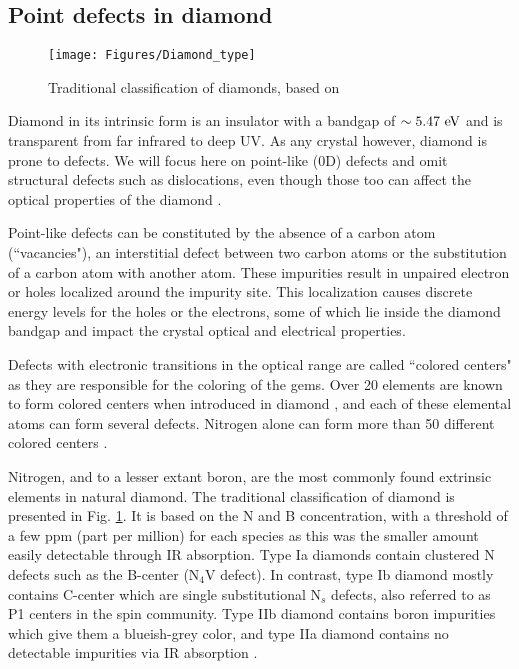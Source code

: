 \documentclass[a4paper,11pt]{report}
\begin{document}
\subsection{Point defects in diamond}
\begin{figure}[h!]
\centering
\texttt{[image: Figures/Diamond\_type]}
\caption{Traditional classification of diamonds, based on \citep{tappert2011diamonds}}
\label{diamond type}
\end{figure}
Diamond in its intrinsic form is an insulator with a bandgap of $\sim 5.47\ \rm eV$ and is transparent from far infrared to deep UV. As any crystal however, diamond is prone to defects. We will focus here on point-like (0D) defects and omit structural defects such as dislocations, even though those too can affect the optical properties of the diamond \citep{collins2000colour}. 

Point-like defects can be constituted by the absence of a carbon atom (``vacancies"), an interstitial defect between two carbon atoms or the substitution of a carbon atom with another atom. These impurities result in unpaired electron or holes localized around the impurity site. This localization causes discrete energy levels for the holes or the electrons, some of which lie inside the diamond bandgap and impact the crystal optical and electrical properties. 

Defects with electronic transitions in the optical range are called ``colored centers" as they are responsible for the coloring of the gems.  Over 20 elements are known to form colored centers when introduced in diamond \citep{zaitsev2013optical, shenderova2019synthesis}, and each of these elemental atoms can form several defects. Nitrogen alone can form more than 50 different colored centers \citep{dobrinets2016hpht, ashfold2020nitrogen}.

Nitrogen, and to a lesser extant boron, are the most commonly found extrinsic elements in natural diamond. The traditional classification of diamond is presented in Fig. \ref{diamond type}. It is based on the N and B concentration, with a threshold of a few ppm (part per million) for each species as this was the smaller amount easily detectable through IR absorption. Type Ia diamonds contain clustered N defects such as the B-center (N$_4$V defect). In contrast, type Ib diamond mostly contains C-center which are single substitutional N$_s$ defects, also referred to as P1 centers in the spin community. Type IIb diamond contains boron impurities which give them a blueish-grey color, and type IIa diamond contains no detectable impurities via IR absorption \citep{ashfold2020nitrogen}.
\end{document}
